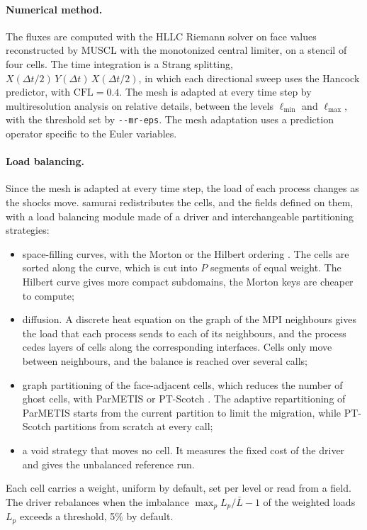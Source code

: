 \paragraph{Numerical method.}
The fluxes are computed with the HLLC Riemann solver on face values
reconstructed by MUSCL with the monotonized central limiter, on a stencil of
four cells. The time integration is a Strang splitting,
$X(\Delta t/2)\,Y(\Delta t)\,X(\Delta t/2)$, in which each directional sweep
uses the Hancock predictor, with $\mathrm{CFL} = 0.4$. The mesh is adapted at
every time step by multiresolution analysis
\cite{cohen_fully_2003,bellotti_multidimensional_2022} on relative details,
between the levels $\ell_{\min}$ and $\ell_{\max}$, with the threshold set by
\texttt{-{}-mr-eps}. The mesh adaptation uses a prediction operator specific to the
Euler variables.

\paragraph{Load balancing.}
Since the mesh is adapted at every time step, the load of each process changes
as the shocks move. samurai redistributes the cells, and the fields defined on
them, with a load balancing module made of a driver and interchangeable
partitioning strategies:
\begin{itemize}
\item space-filling curves, with the Morton or the Hilbert ordering
  \cite{bader_space-filling_2013}. The cells are sorted along the curve, which
  is cut into $P$ segments of equal weight. The Hilbert curve gives more compact
  subdomains, the Morton keys are cheaper to compute;
\item diffusion. A discrete heat equation on the graph of the MPI neighbours
  \cite{cybenko_dynamic_1989} gives the load that each process sends to each
  of its neighbours, and the process cedes layers of cells along the
  corresponding interfaces. Cells only move between neighbours, and the balance
  is reached over several calls;
\item graph partitioning of the face-adjacent cells, which reduces the number of
  ghost cells, with ParMETIS \cite{karypis_parallel_1996} or PT-Scotch
  \cite{chevalier_pt-scotch_2008}. The adaptive repartitioning of ParMETIS
  starts from the current partition to limit the migration, while PT-Scotch
  partitions from scratch at every call;
\item a void strategy that moves no cell. It measures the fixed cost of the
  driver and gives the unbalanced reference run.
\end{itemize}
Each cell carries a weight, uniform by default, set per level or read from a
field. The driver rebalances when the imbalance $\max_p L_p / \bar{L} - 1$ of
the weighted loads $L_p$ exceeds a threshold, 5\% by default.

